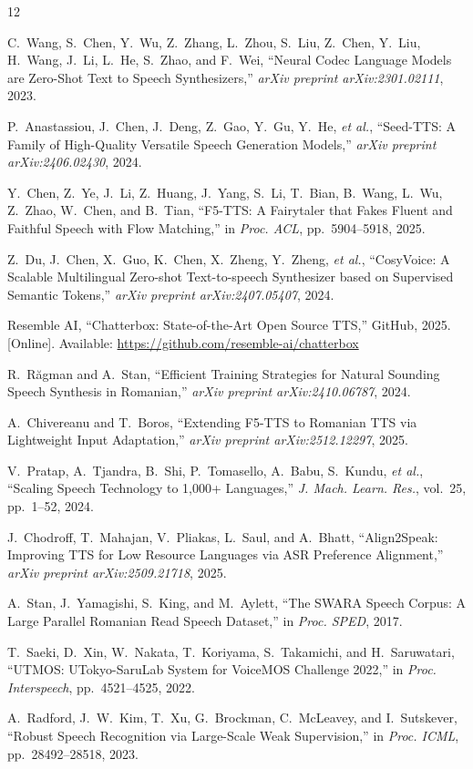\documentclass[conference]{IEEEtran}
\begin{document}
\balance
\begin{thebibliography}{12}

C.~Wang, S.~Chen, Y.~Wu, Z.~Zhang, L.~Zhou, S.~Liu, Z.~Chen,
Y.~Liu, H.~Wang, J.~Li, L.~He, S.~Zhao, and F.~Wei,
``Neural Codec Language Models are Zero-Shot Text to Speech Synthesizers,''
\textit{arXiv preprint arXiv:2301.02111}, 2023.

P.~Anastassiou, J.~Chen, J.~Deng, Z.~Gao, Y.~Gu, Y.~He,
\textit{et al.},
``Seed-TTS: A Family of High-Quality Versatile Speech Generation Models,''
\textit{arXiv preprint arXiv:2406.02430}, 2024.

Y.~Chen, Z.~Ye, J.~Li, Z.~Huang, J.~Yang, S.~Li, T.~Bian,
B.~Wang, L.~Wu, Z.~Zhao, W.~Chen, and B.~Tian,
``F5-TTS: A Fairytaler that Fakes Fluent and Faithful Speech with Flow Matching,''
in \textit{Proc. ACL}, pp.\ 5904--5918, 2025.

Z.~Du, J.~Chen, X.~Guo, K.~Chen, X.~Zheng, Y.~Zheng, \textit{et al.},
``CosyVoice: A Scalable Multilingual Zero-shot Text-to-speech Synthesizer
based on Supervised Semantic Tokens,''
\textit{arXiv preprint arXiv:2407.05407}, 2024.

Resemble AI,
``Chatterbox: State-of-the-Art Open Source TTS,''
GitHub, 2025. [Online]. Available:
\url{https://github.com/resemble-ai/chatterbox}

R.~R\u{a}gman and A.~Stan,
``Efficient Training Strategies for Natural Sounding Speech Synthesis
in Romanian,''
\textit{arXiv preprint arXiv:2410.06787}, 2024.

A.~Chivereanu and T.~Boros,
``Extending F5-TTS to Romanian TTS via Lightweight Input Adaptation,''
\textit{arXiv preprint arXiv:2512.12297}, 2025.

V.~Pratap, A.~Tjandra, B.~Shi, P.~Tomasello, A.~Babu,
S.~Kundu, \textit{et al.},
``Scaling Speech Technology to 1,000+ Languages,''
\textit{J. Mach. Learn. Res.}, vol.~25, pp.~1--52, 2024.

J.~Chodroff, T.~Mahajan, V.~Pliakas, L.~Saul, and A.~Bhatt,
``Align2Speak: Improving TTS for Low Resource Languages via
ASR Preference Alignment,''
\textit{arXiv preprint arXiv:2509.21718}, 2025.

A.~Stan, J.~Yamagishi, S.~King, and M.~Aylett,
``The SWARA Speech Corpus: A Large Parallel Romanian Read Speech
Dataset,''
in \textit{Proc. SPED}, 2017.

T.~Saeki, D.~Xin, W.~Nakata, T.~Koriyama, S.~Takamichi,
and H.~Saruwatari,
``UTMOS: UTokyo-SaruLab System for VoiceMOS Challenge 2022,''
in \textit{Proc. Interspeech}, pp.\ 4521--4525, 2022.

A.~Radford, J.~W.~Kim, T.~Xu, G.~Brockman, C.~McLeavey,
and I.~Sutskever,
``Robust Speech Recognition via Large-Scale Weak Supervision,''
in \textit{Proc. ICML}, pp.\ 28492--28518, 2023.

\end{thebibliography}
\end{document}
